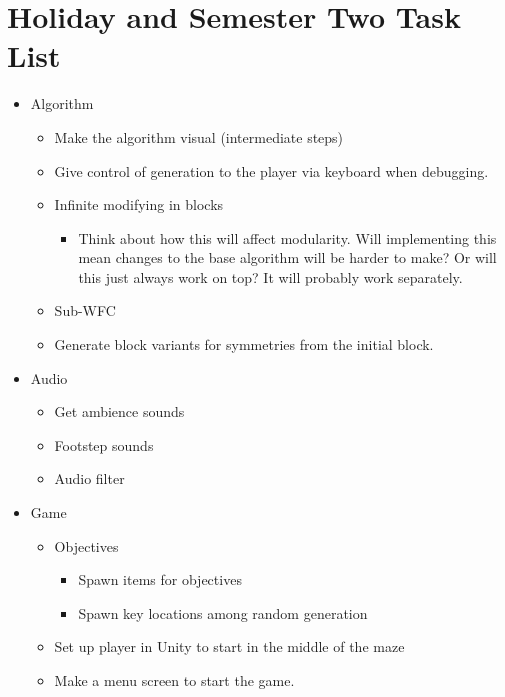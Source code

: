 \chapter{Holiday and Semester Two Task List}\label{sec:tasks}
\begin{itemize}
    \item Algorithm
          \begin{itemize}
              \item Make the algorithm visual (intermediate steps)
              \item Give control of generation to the player via keyboard when debugging.
              \item Infinite modifying in blocks
                    \begin{itemize}
                        \item Think about how this will affect modularity. Will implementing this mean changes to the base algorithm will be harder to make? Or will this just always work on top? It will probably work separately.
                    \end{itemize}
              \item Sub-WFC
              \item Generate block variants for symmetries from the initial block.
          \end{itemize}
    \item Audio
          \begin{itemize}
              \item Get ambience sounds
              \item Footstep sounds
              \item Audio filter
          \end{itemize}
    \item Game
          \begin{itemize}
              \item Objectives
                    \begin{itemize}
                        \item Spawn items for objectives
                        \item Spawn key locations among random generation
                    \end{itemize}
              \item Set up player in Unity to start in the middle of the maze
              \item Make a menu screen to start the game.
          \end{itemize}

\end{itemize}
